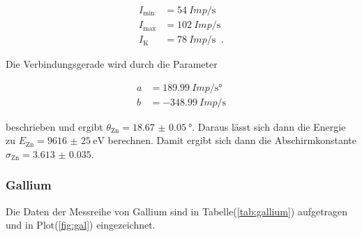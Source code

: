             \begin{align*}
                I_{\text{min}} &= \SI{54}{Imp\per\second}\\
                I_{\text{max}} &= \SI{102}{Imp\per\second}\\
                I_{\text{K}} &= \SI{78}{Imp\per\second} \; \; \text{.}
            \end{align*}

            \noindent Die Verbindungsgerade wird durch die Parameter 

            \begin{align*}
                a & = \SI{189.99}{Imp\per\second\degree}\\
                b & = \SI{-348.99}{Imp\per\second}
            \end{align*}

            \noindent beschrieben und ergibt $\theta_{\text{Zn}} = \SI{18.67(5)}{\degree}$. Daraus lässt sich dann die Energie zu $E_{\text{Zn}} = \SI{9616(25)}{\electronvolt}$ berechnen. 
            Damit ergibt sich dann die Abschirmkonstante $\sigma_{\text{Zn}}= \num{3.613(35)}$.

        \subsubsection{Gallium}
            
            \noindent Die Daten der Messreihe von Gallium sind in Tabelle(\ref{tab:gallium}) aufgetragen und in Plot(\ref{fig:gal}) eingezeichnet.

